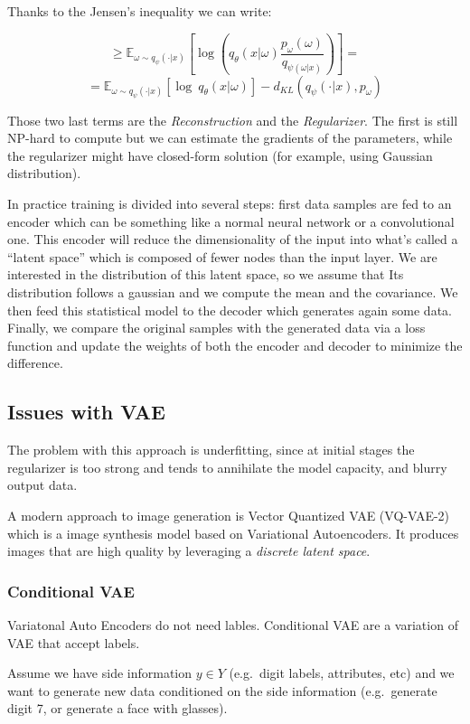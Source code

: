 \documentclass{article}
\begin{document}
Thanks to the Jensen's inequality we can write:

\[\ge \mathbb{E}_{\omega \sim q_\psi (\cdot|x)}[\log(q_{\theta}(x|\omega)\frac{p_{\omega}(\omega)}{q_{\psi (\omega | x)}})] =\]
\[=  \mathbb{E}_{\omega \sim q_\psi (\cdot|x)}[\log\ q_\theta (x|\omega)]-d_{KL}(q_\psi (\cdot|x), p_\omega)\]

Those two last terms are the \emph{Reconstruction} and the
\emph{Regularizer}. The first is still NP-hard to compute but we can
estimate the gradients of the parameters, while the regularizer might
have closed-form solution (for example, using Gaussian distribution).

In practice training is divided into several steps: first data samples
are fed to an encoder which can be something like a normal neural
network or a convolutional one. This encoder will reduce the
dimensionality of the input into what's called a ``latent space'' which
is composed of fewer nodes than the input layer. We are interested in
the distribution of this latent space, so we assume that Its
distribution follows a gaussian and we compute the mean and the
covariance. We then feed this statistical model to the decoder which
generates again some data. Finally, we compare the original samples with
the generated data via a loss function and update the weights of both
the encoder and decoder to minimize the difference.

\subsection{Issues with VAE}\label{issues-with-vae}

The problem with this approach is underfitting, since at initial stages
the regularizer is too strong and tends to annihilate the model
capacity, and blurry output data.

A modern approach to image generation is Vector Quantized VAE (VQ-VAE-2)
which is a image synthesis model based on Variational Autoencoders. It
produces images that are high quality by leveraging a \emph{discrete
latent space}.

\subsubsection{Conditional VAE}\label{conditional-vae}

Variatonal Auto Encoders do not need lables. Conditional VAE are a
variation of VAE that accept labels.

Assume we have side information \(y\in Y\) (e.g.~digit labels,
attributes, etc) and we want to generate new data conditioned on the
side information (e.g.~generate digit 7, or generate a face with
glasses).
\end{document}
